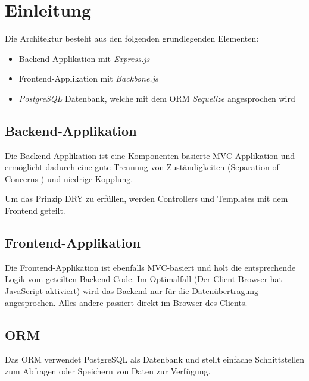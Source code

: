 \section{Einleitung}

Die Architektur besteht aus den folgenden grundlegenden Elementen:
\begin{itemize}
	\item Backend-Applikation mit \emph{Express.js} \cite{Expressjs}
	\item Frontend-Applikation mit \emph{Backbone.js} \cite{Backbonejs}
	\item \emph{PostgreSQL} \cite{PostgreSQL} Datenbank, welche mit dem \gls{ORM} \emph{Sequelize} \cite{Sequelize} angesprochen wird
\end{itemize}

\subsection{Backend-Applikation}

Die Backend-Applikation ist eine Komponenten-basierte MVC Applikation und ermöglicht dadurch eine gute Trennung von Zuständigkeiten (Separation of Concerns \cite{SeparationOfConcerns}) und niedrige Kopplung.

Um das Prinzip \gls{DRY} zu erfüllen, werden Controllers und Templates mit dem Frontend geteilt.

\subsection{Frontend-Applikation}

Die Frontend-Applikation ist ebenfalls MVC-basiert und holt die entsprechende Logik vom geteilten Backend-Code.
Im Optimalfall (Der Client-Browser hat JavaScript aktiviert) wird das Backend nur für die Datenübertragung angesprochen. Alles andere passiert direkt im Browser des Clients.

\subsection{ORM}

Das \gls{ORM} verwendet PostgreSQL \cite{PostgreSQL} als Datenbank und stellt einfache Schnittstellen zum Abfragen oder Speichern von Daten zur Verfügung.